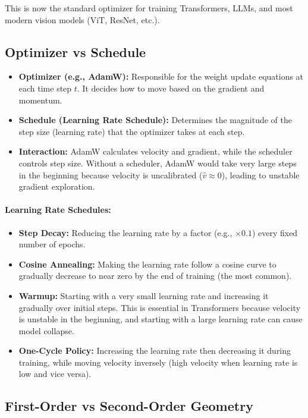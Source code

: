 This is now the standard optimizer for training Transformers, LLMs, and most modern vision models (ViT, ResNet, etc.).

\subsection{Optimizer vs Schedule}

\begin{itemize}
    \item \textbf{Optimizer (e.g., AdamW):} Responsible for the weight update equations at each time step $t$. It decides how to move based on the gradient and momentum.
    \item \textbf{Schedule (Learning Rate Schedule):} Determines the magnitude of the step size (learning rate) that the optimizer takes at each step.
    \item \textbf{Interaction:} AdamW calculates velocity and gradient, while the scheduler controls step size. Without a scheduler, AdamW would take very large steps in the beginning because velocity is uncalibrated ($\hat{v} \approx 0$), leading to unstable gradient exploration.
\end{itemize}

\paragraph{Learning Rate Schedules:}
\begin{itemize}
    \item \textbf{Step Decay:} Reducing the learning rate by a factor (e.g., $\times 0.1$) every fixed number of epochs.
    \item \textbf{Cosine Annealing:} Making the learning rate follow a cosine curve to gradually decrease to near zero by the end of training (the most common).
    \item \textbf{Warmup:} Starting with a very small learning rate and increasing it gradually over initial steps. This is essential in Transformers because velocity is unstable in the beginning, and starting with a large learning rate can cause model collapse.
    \item \textbf{One-Cycle Policy:} Increasing the learning rate then decreasing it during training, while moving velocity inversely (high velocity when learning rate is low and vice versa).
\end{itemize}

\subsection{First-Order vs Second-Order Geometry}

